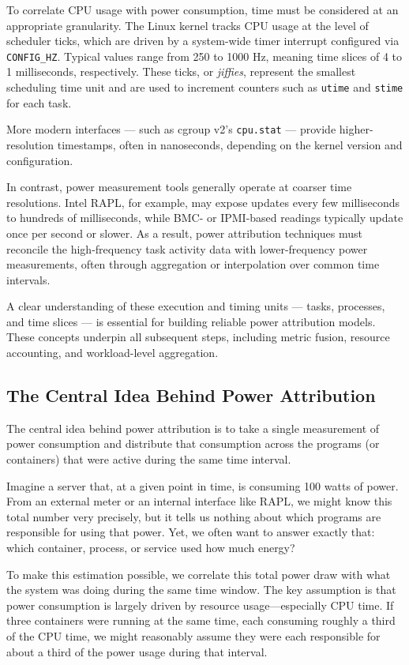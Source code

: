 To correlate CPU usage with power consumption, time must be considered at an appropriate granularity. The Linux kernel tracks CPU usage at the level of scheduler ticks, which are driven by a system-wide timer interrupt configured via \texttt{CONFIG\_HZ}. Typical values range from 250 to 1000 Hz, meaning time slices of 4 to 1 milliseconds, respectively. These ticks, or \emph{jiffies}, represent the smallest scheduling time unit and are used to increment counters such as \texttt{utime} and \texttt{stime} for each task.

More modern interfaces — such as cgroup v2’s \texttt{cpu.stat} — provide higher-resolution timestamps, often in nanoseconds, depending on the kernel version and configuration.

In contrast, power measurement tools generally operate at coarser time resolutions. Intel RAPL, for example, may expose updates every few milliseconds to hundreds of milliseconds, while BMC- or IPMI-based readings typically update once per second or slower. As a result, power attribution techniques must reconcile the high-frequency task activity data with lower-frequency power measurements, often through aggregation or interpolation over common time intervals.

A clear understanding of these execution and timing units — tasks, processes, and time slices — is essential for building reliable power attribution models. These concepts underpin all subsequent steps, including metric fusion, resource accounting, and workload-level aggregation.


\subsection{The Central Idea Behind Power Attribution}

The central idea behind power attribution is to take a single measurement of power consumption and distribute that consumption across the programs (or containers) that were active during the same time interval. 

Imagine a server that, at a given point in time, is consuming 100 watts of power. From an external meter or an internal interface like RAPL, we might know this total number very precisely, but it tells us nothing about which programs are responsible for using that power. Yet, we often want to answer exactly that: which container, process, or service used how much energy?

To make this estimation possible, we correlate this total power draw with what the system was doing during the same time window. The key assumption is that power consumption is largely driven by resource usage—especially CPU time. If three containers were running at the same time, each consuming roughly a third of the CPU time, we might reasonably assume they were each responsible for about a third of the power usage during that interval.



